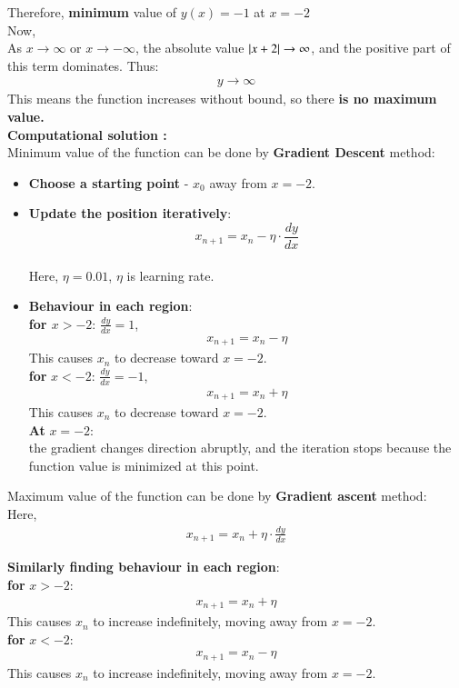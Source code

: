 \documentclass[journal]{IEEEtran}
\begin{document}
Therefore, \textbf{minimum} value of $y(x) = -1$  at $x = -2$ \\


Now,\\
As $x \rightarrow \infty$ or $x \rightarrow -\infty$, the absolute value $\left\vert x+2\right\vert \rightarrow \infty$, and the positive part of this term dominates. Thus:
\begin{align}
    y \rightarrow \infty
\end{align}
This means the function increases without bound, so there \textbf{is no maximum value.}\\


\textbf{Computational solution :}\\
Minimum value of the function can be done by \textbf{Gradient Descent} method:
\begin{itemize}
    \item \textbf{Choose a starting point} - $x_0$ away from $x = -2$.
    \item \textbf{Update the position iteratively}:
    $$x_{n+1} = x_{n} - \eta \cdot \frac{dy}{dx}$$\\
    Here, $\eta = 0.01$, $\eta$ is learning rate.
    \item \textbf{Behaviour in each region}:\\
    \textbf{for $x > -2$}:   $\frac{dy}{dx} = 1$,
    \begin{align}
        x_{n+1} = x_{n} - \eta
    \end{align}
    This causes $x_n$ to decrease toward $x = -2$.\\
    \textbf{for} $x < -2$: $\frac{dy}{dx} = -1$,
    \begin{align}
        x_{n+1} = x_{n} + \eta
    \end{align}
    This causes $x_n$ to decrease toward $x = -2$.\\
\textbf{At} $x = -2$:  \\
the gradient changes direction abruptly, and the iteration stops because the function value is minimized at this point.
\end{itemize}
Maximum value of the function can be done by \textbf{Gradient ascent} method:\\

Here,
\begin{align}
    x_{n+1} = x_{n} + \eta \cdot \frac{dy}{dx}
\end{align}

\textbf{Similarly finding behaviour in each region}:\\
\textbf{for} $x>-2$: \\
\begin{align}
    x_{n+1} = x_{n} + \eta
\end{align}
This causes $x_n$ to increase indefinitely, moving away from $x = -2$.\\
\textbf{for} $x<-2$: \\
\begin{align}
    x_{n+1} = x_{n} - \eta
\end{align}
This causes $x_n$ to increase indefinitely, moving away from $x = -2$.\\ 
\end{document}
